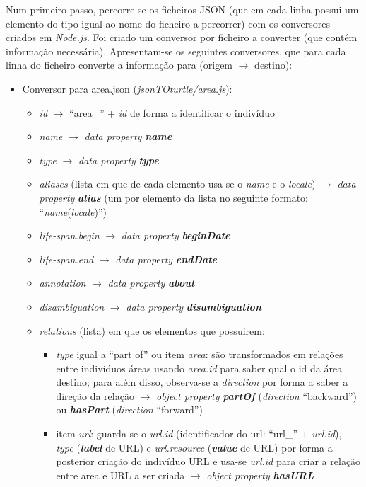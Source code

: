 \documentclass{article}
\begin{document}
Num primeiro passo, percorre-se os ficheiros JSON (que em cada linha possui um elemento do tipo igual ao nome do ficheiro a percorrer) com os conversores criados em \textit{Node.js}. Foi criado um conversor por ficheiro a converter (que contém informação necessária). Apresentam-se os seguintes conversores, que para cada linha do ficheiro converte a informação para (origem $\to$ destino):
\begin{itemize}
    \item Conversor para area.json (\textit{jsonTOturtle/area.js}):
        \begin{itemize}
            \item \textit{id} $\to$ ``area\_'' + \textit{id} de forma a identificar o indivíduo
            \item \textit{name} $\to$ \textit{data property} \textit{\textbf{name}}
            \item \textit{type} $\to$ \textit{data property} \textit{\textbf{type}}
            \item \textit{aliases} (lista em que de cada elemento usa-se o \textit{name} e o \textit{locale}) $\to$ \textit{data property} \textit{\textbf{alias}} (um por elemento da lista no seguinte formato: ``\textit{name}(\textit{locale})'')
            \item \textit{life-span.begin} $\to$ \textit{data property} \textit{\textbf{beginDate}}
            \item \textit{life-span.end} $\to$ \textit{data property} \textit{\textbf{endDate}}
            \item \textit{annotation} $\to$ \textit{data property} \textit{\textbf{about}}
            \item \textit{disambiguation} $\to$ \textit{data property} \textit{\textbf{disambiguation}}
            \item \textit{relations} (lista) em que os elementos que possuirem:
                \begin{itemize}
                    \item \textit{type} igual a ``part of'' ou item \textit{area}: são transformados em relações entre indivíduos áreas usando \textit{area.id} para saber qual o id da área destino; para além disso, observa-se a \textit{direction} por forma a saber a direção da relação $\to$ \textit{object property} \textit{\textbf{partOf}} (\textit{direction} ``backward'') ou \textit{\textbf{hasPart}} (\textit{direction} ``forward'')
                    \item item \textit{url}: guarda-se o \textit{url.id} (identificador do url: ``url\_'' + \textit{url.id}), \textit{type} (\textit{\textbf{label}} de URL) e \textit{url.resource} (\textit{\textbf{value}} de URL) por forma a posterior criação do indivíduo URL e usa-se \textit{url.id} para criar a relação entre area e URL a ser criada $\to$ \textit{object property} \textit{\textbf{hasURL}}

\end{itemize}
\end{itemize}
\end{itemize}
\end{document}
